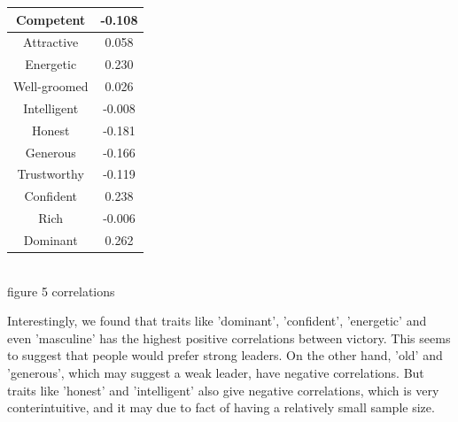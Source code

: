 \documentclass[12pt]{article}
\newenvironment{p4}[2][V Predicting Election Outcomes with Face Social Attributes]{\begin{trivlist}
\item[\hskip \labelsep {\bfseries #1}\hskip \labelsep {\bfseries #2}]}{\end{trivlist}}
\begin{document}
\begin{p4}{}
\begin{center}
\begin{tabular}{||c c||}
		\hline
		Competent & -0.108\\
		\hline
		Attractive & 0.058\\
		\hline
		Energetic & 0.230\\
		\hline
		Well-groomed & 0.026\\
		\hline
		Intelligent & -0.008\\
		\hline
		Honest & -0.181\\
		\hline
		Generous & -0.166\\
		\hline
		Trustworthy & -0.119\\
		\hline
		Confident & 0.238\\
		\hline
		Rich & -0.006\\
		\hline
		Dominant & 0.262\\
		\hline
	\end{tabular}
	{\\figure 5 correlations}
\end{center}
Interestingly, we found that traits like 'dominant', 'confident', 'energetic' and even 'masculine' has the highest positive correlations between victory. This seems to suggest that people would prefer strong leaders. On the other hand, 'old' and 'generous', which may suggest a weak leader, have negative correlations. But traits like 'honest' and 'intelligent' also give negative correlations, which is very conterintuitive, and it may due to fact of having a relatively small sample size.
\end{p4}

 
\end{document}
